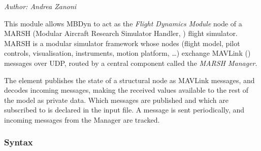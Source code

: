 %
%
%
%
%
%
%
%
%

\emph{Author: Andrea Zanoni}

\bigskip

This module allows MBDyn to act as the \emph{Flight Dynamics Module} node of
a MARSH (Modular Aircraft Research Simulator Handler,
)
flight simulator.
MARSH is a modular simulator framework whose nodes (flight model, pilot
controls, visualisation, instruments, motion platform, \ldots) exchange
MAVLink
()
messages over UDP, routed by a central component called the \emph{MARSH
Manager}.

The element publishes the state of a structural node as MAVLink messages,
and decodes incoming messages, making the received values available to the
rest of the model as private data.
Which messages are published and which are subscribed to is declared in the
input file.
A  message is sent periodically, and incoming 
messages from the Manager are tracked.

\subsubsection{Syntax}

